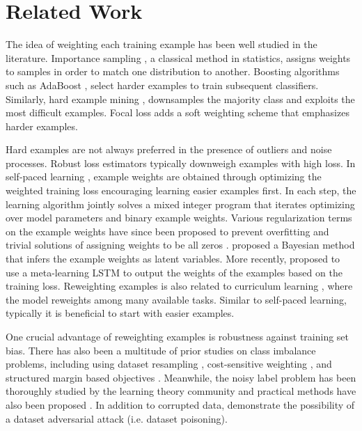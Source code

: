 
\section{Related Work}
The idea of weighting each training example has been well studied in the literature. Importance
sampling \cite{importantsample}, a classical method in statistics, assigns weights to samples in
order to match one distribution to another. Boosting algorithms such as AdaBoost \cite{adaboost},
select harder examples to train subsequent classifiers. Similarly, hard example mining
\cite{hardneg}, downsamples the majority class and exploits the most difficult examples. Focal loss
\cite{focal} adds a soft weighting scheme that emphasizes harder examples.

Hard examples are not always preferred in the presence of outliers and noise processes. Robust loss
estimators typically downweigh examples with high loss. In self-paced learning
\cite{kumar10selfpaced}, example weights are obtained through optimizing the weighted training loss
encouraging learning easier examples first. In each step, the learning algorithm jointly solves a
mixed integer program that iterates optimizing over model parameters and binary example weights.
Various regularization terms  on the example weights have since been proposed to prevent overfitting
and trivial solutions of assigning weights to be all zeros \cite{kumar10selfpaced,spaco,spcl}.
\citet{wang17reweight} proposed a Bayesian method that infers the example weights as latent
variables. More recently, \citet{jiang17mentornet} proposed to use a meta-learning LSTM to output
the weights of the examples based on the training loss. Reweighting examples is also related to
curriculum learning \cite{bengio09curriculum}, where the model reweights among many available tasks.
Similar to self-paced learning, typically it is beneficial to start with easier examples.

One crucial advantage of reweighting examples is robustness against training set bias. There has
also been a multitude of prior studies on class imbalance problems, including using dataset
resampling \cite{smote,dong17imbalance}, cost-sensitive weighting
\cite{costsensitive,costsensitivedeep}, and structured margin based objectives \cite{lmle}.
Meanwhile, the noisy label problem has been thoroughly studied by the learning theory community
\cite{natarajan13noisy,noisytheory} and practical methods have also been proposed
\cite{reed14noisy,sukhbaatar14convnoise,xiao15noisy,azadi16air,goldberger17noise,
li17noisydistill,jiang17mentornet,vahdat17crf,glc}.  In addition to corrupted data,
\citet{kohL17influence,datapoison} demonstrate the possibility of a dataset adversarial attack (i.e.
dataset poisoning).

